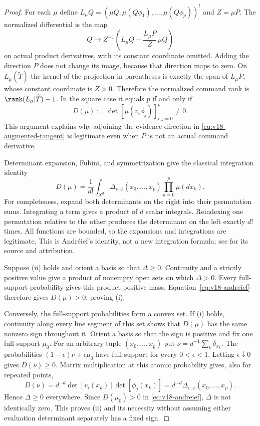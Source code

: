 \begin{proof}
For each $\mu$ define $L_\mu Q=(\mu Q,\mu(Q\phi_1),\ldots,
\mu(Q\phi_p))^t$ and $Z=\mu P$. The normalized differential is the
map
\[
 Q\longmapsto Z^{-1}\left(L_\mu Q-
              \frac{L_\mu P}{Z}\,\mu Q\right)
\]
on actual product derivatives, with its constant coordinate omitted.
Adding the direction $P$ does not change its image, because that
direction maps to zero. On $L_\mu(\widetilde T)$ the kernel of the
projection in parentheses is exactly the span of $L_\mu P$, whose
constant coordinate is $Z>0$. Therefore the normalized command rank
is $\rank(L_\mu|\widetilde T)-1$. In the square case it equals $p$
if and only if
\[
 D(\mu):=\det[\mu(v_i\phi_j)]_{i,j=0}^p\ne0.
\]
This argument explains why adjoining the evidence direction in
\eqref{eq:v18-augmented-tangent} is legitimate even when $P$ is not an
actual command derivative.

Determinant expansion, Fubini, and symmetrization give the classical
integration identity
\begin{equation}\label{eq:v18-andreief}
 D(\mu)=\frac1{d!}\int_{X^d}\Delta_{v,\phi}(x_0,\ldots,x_p)
                     \prod_{k=0}^p\mu(dx_k).
\end{equation}
For completeness, expand both determinants on the right into their
permutation sums. Integrating a term gives a product of $d$ scalar
integrals. Reindexing one permutation relative to the other produces
the determinant on the left exactly $d!$ times. All functions are
bounded, so the expansions and integrations are legitimate. This is
Andr\'eief's identity, not a new integration formula; see
\cite{ForresterAndreief} for its source and attribution.

Suppose \textup{(ii)} holds and orient a basis so that $\Delta\ge0$.
Continuity and a strictly positive value give a product of nonempty
open sets on which $\Delta>0$. Every full-support probability gives
this product positive mass. Equation~\eqref{eq:v18-andreief} therefore
gives $D(\mu)>0$, proving \textup{(i)}.

Conversely, the full-support probabilities form a convex set. If
\textup{(i)} holds, continuity along every line segment of this set
shows that $D(\mu)$ has the same nonzero sign throughout it. Orient a
basis so that the sign is positive and fix one full-support $\mu_0$.
For an arbitrary tuple $(x_0,\ldots,x_p)$ put
$\nu=d^{-1}\sum_k\delta_{x_k}$. The probabilities
$(1-\epsilon)\nu+\epsilon\mu_0$ have full support for every
$0<\epsilon<1$. Letting $\epsilon\downarrow0$ gives $D(\nu)\ge0$.
Matrix multiplication at this atomic probability gives, also for
repeated points,
\[
 D(\nu)=d^{-d}\det[v_i(x_k)]\det[\phi_j(x_k)]
       =d^{-d}\Delta_{v,\phi}(x_0,\ldots,x_p).
\]
Hence $\Delta\ge0$ everywhere. Since $D(\mu_0)>0$ in
\eqref{eq:v18-andreief}, $\Delta$ is not identically zero. This proves
\textup{(ii)} and its necessity without assuming either evaluation
determinant separately has a fixed sign.


\end{proof}
